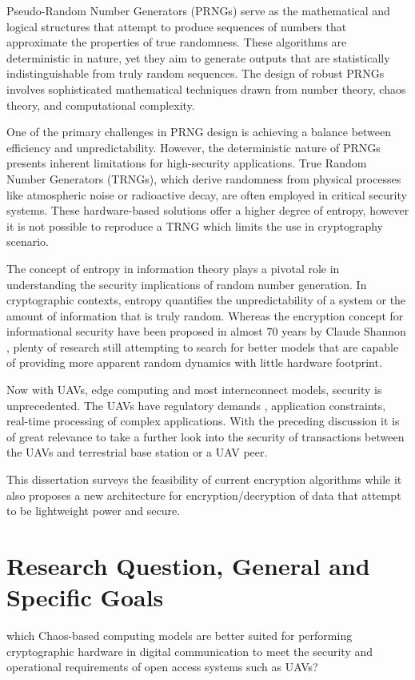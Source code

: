 Pseudo-Random Number Generators (PRNGs) serve as the mathematical and logical structures that attempt to produce sequences of numbers that approximate the properties of true randomness. These algorithms are deterministic in nature, yet they aim to generate outputs that are statistically indistinguishable from truly random sequences. The design of robust PRNGs involves sophisticated mathematical techniques drawn from number theory, chaos theory, and computational complexity.


One of the primary challenges in PRNG design is achieving a balance between efficiency and unpredictability. However, the deterministic nature of PRNGs presents inherent limitations for high-security applications. True Random Number Generators (TRNGs), which derive randomness from physical processes like atmospheric noise or radioactive decay, are often employed in critical security systems. These hardware-based solutions offer a higher degree of entropy, however it is not possible to reproduce a TRNG which limits the use in cryptography scenario.

The concept of entropy in information theory plays a pivotal role in understanding the security implications of random number generation. In cryptographic contexts, entropy quantifies the unpredictability of a system or the amount of information that is truly random. Whereas the encryption concept for informational security have been proposed in almost 70 years by Claude Shannon \cite{Shannon.1949,Shannon1948}, plenty of research still attempting to search for better models that are capable of providing more apparent random dynamics with little hardware footprint.

Now with UAVs, edge computing and most internconnect models, security is unprecedented. The UAVs have regulatory demands \cite{RTCA_DO362,RTCA_DO366}, application constraints, real-time processing of complex applications. With the preceding discussion it is of great relevance to take a further look into the security of transactions between the UAVs and terrestrial base station or a UAV peer.

This dissertation surveys the feasibility of current encryption algorithms while it also proposes a new architecture for encryption/decryption of data that attempt to be lightweight power and secure.



\section{Research Question, General and Specific Goals}
which Chaos-based computing models are better suited for performing cryptographic hardware in digital communication to meet the security and operational requirements of open access systems such as UAVs?\\

